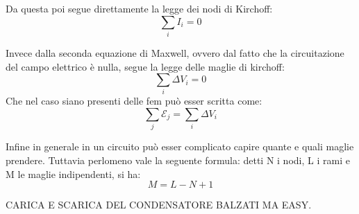 \documentclass{article}
\numberwithin{equation}{section}
\begin{document}
Da questa poi segue direttamente la legge dei nodi di Kirchoff: 
\begin{equation} \label{eq:kirchoff_nodi} 
    \sum_i I_i = 0
\end{equation}

Invece dalla seconda equazione di Maxwell, ovvero dal fatto che la circuitazione del campo elettrico è nulla, segue la legge delle maglie di kirchoff:
\begin{equation}
    \sum_i \Delta V_i = 0
\end{equation}
Che nel caso siano presenti delle fem può esser scritta come:
\begin{equation}
    \sum_j \mathscr E_j = \sum_i \Delta V_i
\end{equation}

Infine in generale in un circuito può esser complicato capire quante e quali maglie prendere. Tuttavia perlomeno vale la seguente formula: detti N i nodi, L i rami e M le maglie indipendenti, si ha:
\begin{equation}
    M = L - N + 1
\end{equation}

CARICA E SCARICA DEL CONDENSATORE BALZATI MA EASY.

\end{document}
